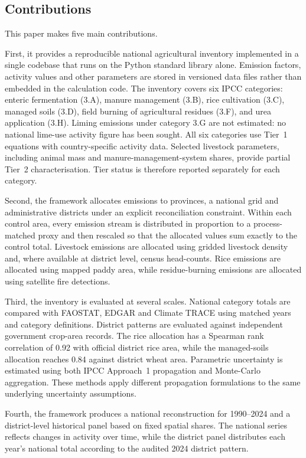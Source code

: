 \subsection{Contributions}
\label{sec:contributions}

This paper makes five main contributions.

First, it provides a reproducible national agricultural inventory implemented in a single
codebase that runs on the Python standard library alone. Emission factors, activity values
and other parameters are stored in versioned data files rather than embedded in the
calculation code. The inventory covers six IPCC categories: enteric fermentation (3.A),
manure management (3.B), rice cultivation (3.C), managed soils (3.D), field burning of
agricultural residues (3.F), and urea application (3.H). Liming emissions under category
3.G are not estimated: no national lime-use activity figure has been sought. All six
categories use Tier~1 equations with country-specific activity data. Selected livestock
parameters, including animal mass and manure-management-system shares, provide partial
Tier~2 characterisation. Tier status is therefore reported separately for each category.

Second, the framework allocates emissions to provinces, a national grid and administrative
districts under an explicit reconciliation constraint. Within each control area, every
emission stream is distributed in proportion to a process-matched proxy and then rescaled
so that the allocated values sum exactly to the control total. Livestock emissions are
allocated using gridded livestock density and, where available at district level, census
head-counts. Rice emissions are allocated using mapped paddy area, while residue-burning
emissions are allocated using satellite fire detections.

Third, the inventory is evaluated at several scales. National category totals are compared
with FAOSTAT, EDGAR and Climate TRACE using matched years and category definitions.
District patterns are evaluated against independent government crop-area records. The rice
allocation has a Spearman rank correlation of \num{0.92} with official district rice area,
while the managed-soils allocation reaches \num{0.84} against district wheat area.
Parametric uncertainty is estimated using both IPCC Approach~1 propagation and Monte-Carlo
aggregation. These methods apply different propagation formulations to the same underlying
uncertainty assumptions.

Fourth, the framework produces a national reconstruction for 1990--2024 and a
district-level historical panel based on fixed spatial shares. The national series reflects
changes in activity over time, while the district panel distributes each year's national
total according to the audited 2024 district pattern.

